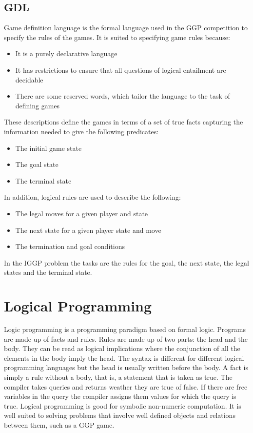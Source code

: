 \subsection{GDL}\label{sec:GDL}
Game definition language is the formal language used in the GGP competition to specify the rules of the games.\cite{GDL_Spec} It is suited to specifying game rules because:
\begin{itemize}
\item It is a purely declarative language
\item It has restrictions to ensure that all questions of logical entailment are decidable
\item There are some reserved words, which tailor the language to the task of defining games
\end{itemize}
These descriptions define the games in terms of a set of true facts capturing the information needed to give the following predicates:
\begin{itemize}
\item The initial game state
\item The goal state
\item The terminal state
\end{itemize}
In addition, logical rules are used to describe the following:
\begin{itemize}
\item The legal moves for a given player and state
\item The next state for a given player state and move
\item The termination and goal conditions
\end{itemize}
In the IGGP problem the tasks are the rules for the goal, the next state, the legal states and the terminal state.


\section{Logical Programming}
Logic programming is a programming paradigm based on formal logic. Programs are made up of facts and rules. Rules are made up of two parts: the head and the body. They can be read as logical implications where the conjunction of all the elements in the body imply the head. The syntax is different for different logical programming languages but the head is usually written before the body. A fact is simply a rule without a body, that is, a statement that is taken as true. The compiler takes queries and returns weather they are true of false. If there are free variables in the query the compiler assigns them values for which the query is true. Logical programming is good for symbolic non-numeric computation. It is well suited to solving problems that involve well defined objects and relations between them, such as a GGP game.




